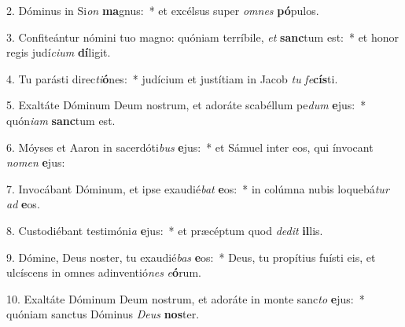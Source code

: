 2. Dóminus in Si\textit{on} \textbf{ma}gnus:~*  et excélsus super \textit{om}\textit{nes} \textbf{pó}pulos.\

3. Confiteántur nómini tuo magno: quóniam terríbile, \textit{et} \textbf{sanc}tum est:~*  et honor regis judí\textit{ci}\textit{um} \textbf{dí}ligit.\

4. Tu parásti direc\textit{ti}\textbf{ó}nes:~*  judícium et justítiam in Jacob \textit{tu} \textit{fe}\textbf{cís}ti.\

5. Exaltáte Dóminum Deum nostrum, et adoráte scabéllum pe\textit{dum} \textbf{e}jus:~*  quón\textit{i}\textit{am} \textbf{sanc}tum est.\

6. Móyses et Aaron in sacerdóti\textit{bus} \textbf{e}jus:~*  et Sámuel inter eos, qui ínvocant \textit{no}\textit{men} \textbf{e}jus:\

7. Invocábant Dóminum, et ipse exaudié\textit{bat} \textbf{e}os:~*  in colúmna nubis loquebá\textit{tur} \textit{ad} \textbf{e}os.\

8. Custodiébant testimóni\textit{a} \textbf{e}jus:~*  et præcéptum quod \textit{de}\textit{dit} \textbf{il}lis.\

9. Dómine, Deus noster, tu exaudié\textit{bas} \textbf{e}os:~*  Deus, tu propítius fuísti eis, et ulcíscens in omnes adinventió\textit{nes} \textit{e}\textbf{ó}rum.\

10. Exaltáte Dóminum Deum nostrum, et adoráte in monte sanc\textit{to} \textbf{e}jus:~*  quóniam sanctus Dóminus \textit{De}\textit{us} \textbf{nos}ter.\

